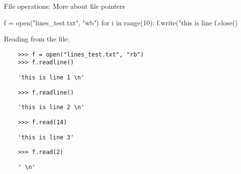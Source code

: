 \begin{frame}[fragile]{File operations: More about file pointers}

  \begin{mlinepython}
    f = open("lines_test.txt", "wb")
    for i in range(10):
        f.write("this is line %
    f.close()
  \end{mlinepython}
  \pause
  \bigskip

  Reading from the file:
  \smallskip

  \begin{verbatim}
    >>> f = open("lines_test.txt", "rb")
    >>> f.readline()
  \end{verbatim}
  \pause
  \vspace{-10pt}
  \begin{verbatim}
    'this is line 1 \n'
  \end{verbatim}
  \pause
  \vspace{-10pt}
  \begin{verbatim}
    >>> f.readline()
  \end{verbatim}
  \pause
  \vspace{-10pt}
  \begin{verbatim}
    'this is line 2 \n'
  \end{verbatim}
  \pause
  \vspace{-10pt}
  \begin{verbatim}
    >>> f.read(14)
  \end{verbatim}
  \pause
  \vspace{-10pt}
  \begin{verbatim}
    'this is line 3'
  \end{verbatim}
  \pause
  \vspace{-10pt}
  \begin{verbatim}
    >>> f.read(2)
  \end{verbatim}
  \pause
  \vspace{-10pt}
  \begin{verbatim}
    ' \n'
  \end{verbatim}

\end{frame}


